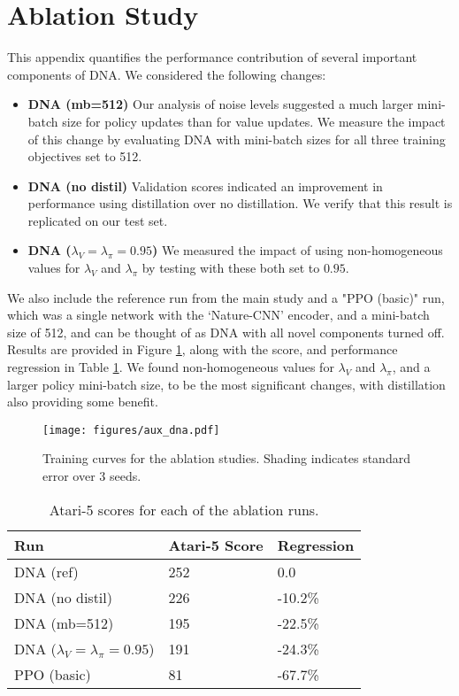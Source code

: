 \documentclass{article}
\begin{document}
\clearpage

\section{Ablation Study}
\label{app:ablation}

This appendix quantifies the performance contribution of several important components of DNA. We considered the following changes:

\begin{itemize}
    \item \textbf{DNA (mb=512)} Our analysis of noise levels suggested a much larger mini-batch size for policy updates than for value updates. We measure the impact of this change by evaluating DNA with mini-batch sizes for all three training objectives set to 512. 
    \item \textbf{DNA (no distil)}    
    Validation scores indicated an improvement in performance using distillation over no distillation. We verify that this result is replicated on our test set. 
    \item \textbf{DNA ($\lambda_V=\lambda_\pi=0.95$)} We measured the impact of using non-homogeneous values for $\lambda_V$ and $\lambda_\pi$ by testing with these both set to $0.95$. 
\end{itemize}

We also include the reference run from the main study and a "PPO (basic)" run, which was a single network with the `Nature-CNN' encoder, and a mini-batch size of 512, and can be thought of as DNA with all novel components turned off. Results are provided in Figure \ref{fig:abl_results}, along with the score, and performance regression in Table \ref{tab:abl_results}. We found non-homogeneous values for $\lambda_V$ and $\lambda_\pi$, and a larger policy mini-batch size, to be the most significant changes, with distillation also providing some benefit. 

\begin{figure}[t]
    \centering
    \texttt{[image: figures/aux\_dna.pdf]}
    \caption{Training curves for the ablation studies. Shading indicates standard error over 3 seeds.}
    \label{fig:abl_results}
\end{figure}

\begin{table}[h]
    \caption{Atari-5 scores for each of the ablation runs.}
    \label{tab:abl_results}
    \centering
    \begin{tabular}{l l l}
    \toprule
        Run & Atari-5 Score & Regression \\
    \midrule
         DNA (ref) & 252 & 0.0 \\
         DNA (no distil) & 226 & -10.2\% \\
         DNA (mb=512) & 195 & -22.5\% \\
         DNA ($\lambda_V=\lambda_\pi=0.95$) & 191 & -24.3\% \\
         PPO (basic) & 81 & -67.7\% \\
    \bottomrule
    \end{tabular}
    
\end{table}
\end{document}
